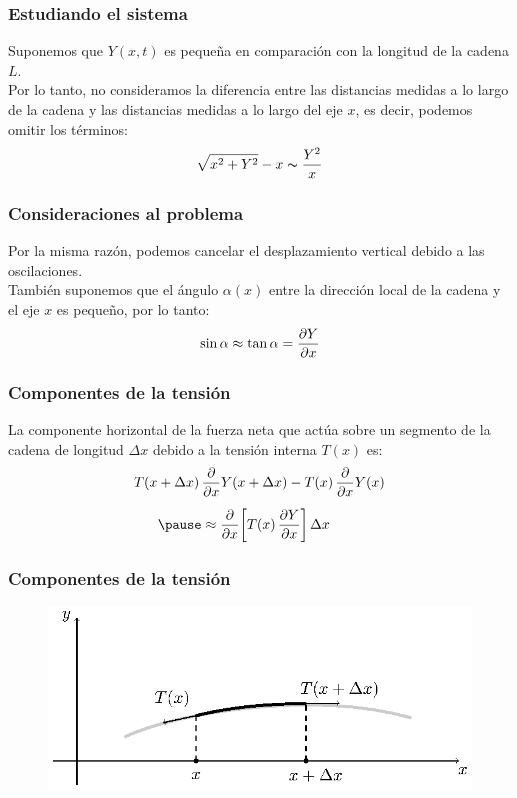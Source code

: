 \documentclass[12pt]{beamer}
\begin{document}
\begin{frame}
\frametitle{Estudiando el sistema}
Suponemos que $Y (x, t)$ es pequeña en comparación con la longitud de la cadena $L$.
\\
\bigskip
\pause
Por lo tanto, no consideramos  la diferencia entre las distancias medidas a lo largo de la cadena y las distancias medidas a lo largo del eje $x$, es decir, podemos omitir los términos:
\pause
\begin{align*}
\sqrt{x^{2} + Y^{2}} - x \thicksim \dfrac{Y^{2}}{x}
\end{align*}
\end{frame}
\begin{frame}
\frametitle{Consideraciones al problema}
Por la misma razón, podemos cancelar el desplazamiento vertical debido a las oscilaciones.
\\
\bigskip
\pause
También suponemos que el ángulo $\alpha (x)$ entre la dirección local de la cadena y el eje $x$ es pequeño, por lo tanto:
\pause
\begin{align}
\sin \alpha \approx \tan \alpha = \pdv{Y}{x}
\label{eq:ecuacion_01}
\end{align}
\end{frame}
\begin{frame}
\frametitle{Componentes de la tensión}
La componente horizontal de la fuerza neta que actúa sobre un segmento de la cadena de longitud $\Delta x$ debido a la tensión interna $T (x)$ es:
\pause
\begin{align}
\begin{aligned}[b]
T (x  + \Delta x) \, &\pdv{x} Y (x + \Delta x) - T (x) \, \pdv{x} Y (x) \\[0.5em] \pause
&\approx \pdv{x} \bigg[ T (x) \, \pdv{Y}{x}  \bigg] \, \Delta x
\end{aligned}
\label{eq:ecuacion_02}
\end{align}
\end{frame}
\begin{frame}
\frametitle{Componentes de la tensión}
\begin{figure}[H]
    \centering
    \includegraphics[scale=1.1]{Imagenes/Cadena_Oscilante_02.eps}
    \label{fig:figura_elemento_cadena}
\end{figure}
\end{frame}
\end{document}
